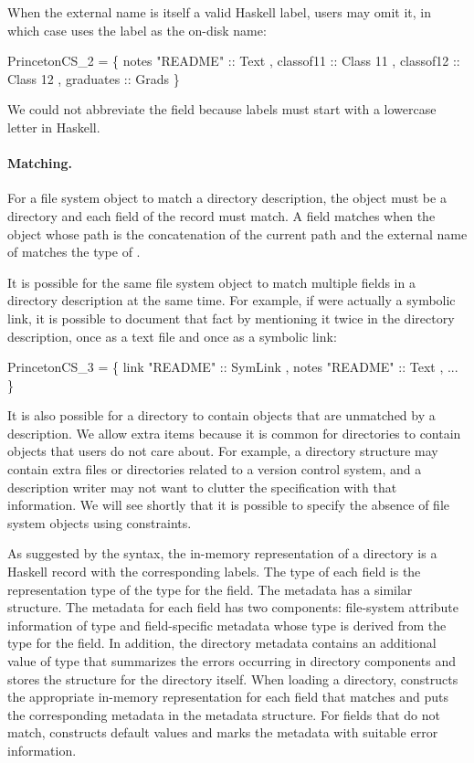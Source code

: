 When the external name is itself a valid Haskell label, users may omit
it, in which case \forest{} uses the label as the on-disk name:
\begin{code}
 PrincetonCS_2 = 
  \{ notes  "README" :: Text
  , classof11 :: Class 11
  , classof12 :: Class 12
  , graduates :: Grads \}
\end{code}
We could not abbreviate the  field because labels must start
with a lowercase letter in Haskell. 

\paragraph*{Matching.}
For a file system object to match a directory description, the object must be a
directory and each field of the record must match.  A field  matches
when the object whose path is the concatenation of the current path
and the external name of  matches the type of .

It is possible for the same file system object to match multiple
fields in a directory description at the same time.  For example, if
 were actually a symbolic link, it is possible to
document that fact by mentioning it twice in the directory
description, once as a text file and once as a symbolic link:
\begin{code}
 PrincetonCS_3 = 
  \{ link   "README" :: SymLink
  , notes  "README" :: Text
  , ... \}
\end{code}

It is also possible for a directory to contain objects
that are unmatched by a description.  We allow extra items because it
is common for directories to contain objects that users do not care
about.  For example, a directory structure may contain extra files or
directories related to a version control system, and a
description writer may not want to clutter the \forest{} specification
with that information.  We will see shortly that it is possible to
specify the absence of file system objects using constraints.

As suggested by the syntax, the in-memory representation of a
directory is a Haskell record with the corresponding labels.  The type
of each field is the representation type of the \forest{} type for the
field. The metadata has a similar structure. The metadata for
each field has two components: file-system attribute information of
type  and field-specific metadata whose type is derived
from the \forest{} type for the field.  In addition, the directory
metadata contains an additional value of type  that 
summarizes the errors occurring in directory components and stores the
 structure for 
the directory itself.
When loading a directory, \forest{} constructs the appropriate in-memory
representation for each field that matches and puts the corresponding
metadata in the metadata structure. For fields that do not 
match, \forest{} constructs default values and marks the metadata with
suitable error information.

